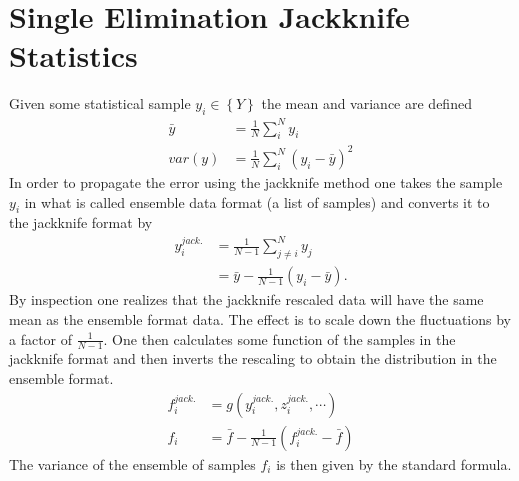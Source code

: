




\section{Single Elimination Jackknife Statistics \label{App:jack}}
Given some statistical sample $y_i \in \left\{{Y}\right\}$ the mean and variance are defined
\begin{align*}
\bar{y} &= \frac{1}{N}\sum_i^Ny_i \\
var(y) &= \frac{1}{N}\sum_i^N \left(y_i - \bar{y}\right)^2
\end{align*}
In order to propagate the error using the jackknife method one takes the sample $y_i$ in what is called ensemble data format (a list of samples) and converts it to the jackknife format by
\begin{align*}
y^{jack.}_i &= \frac{1}{N-1}\sum_{j\ne i}^N y_j \\
&= \bar{y} - \frac{1}{N-1}\left(y_i - \bar{y}\right).
\end{align*}
By inspection one realizes that the jackknife rescaled data will have the same mean as the ensemble format data. The effect is to scale down the fluctuations by a factor of $\frac{1}{N-1}$.  One then calculates some function of the samples in the jackknife format and then inverts the rescaling to obtain the distribution in the ensemble format.
\begin{align*}
f^{jack.}_i &= g\left(y^{jack.}_i,z^{jack.}_i,\cdots\right)\\
f_i &= \bar{f} - \frac{1}{N-1}\left(f_i^{jack.}-\bar{f}\right)
\end{align*}
The variance of the ensemble of samples $f_i$ is then given by the standard formula.







